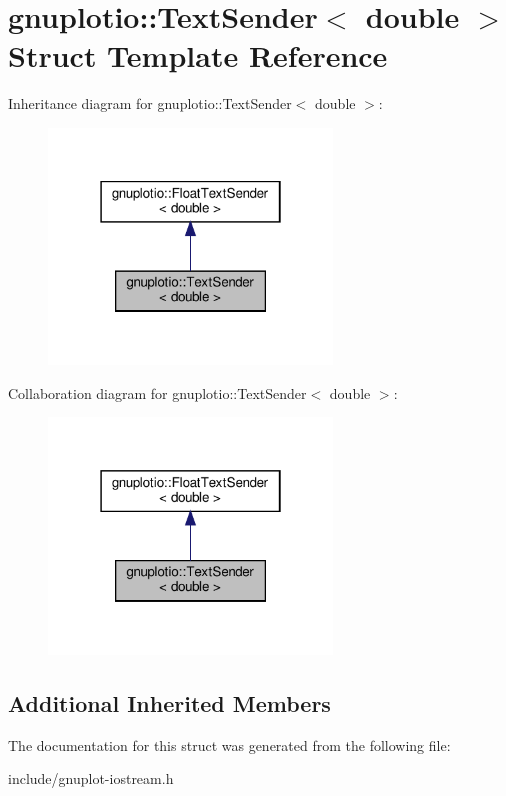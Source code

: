 \hypertarget{structgnuplotio_1_1TextSender_3_01double_01_4}{}\section{gnuplotio\+:\+:Text\+Sender$<$ double $>$ Struct Template Reference}
\label{structgnuplotio_1_1TextSender_3_01double_01_4}


Inheritance diagram for gnuplotio\+:\+:Text\+Sender$<$ double $>$\+:\nopagebreak
\begin{figure}[H]
\begin{center}
\leavevmode
\includegraphics[width=214pt]{structgnuplotio_1_1TextSender_3_01double_01_4__inherit__graph}
\end{center}
\end{figure}


Collaboration diagram for gnuplotio\+:\+:Text\+Sender$<$ double $>$\+:\nopagebreak
\begin{figure}[H]
\begin{center}
\leavevmode
\includegraphics[width=214pt]{structgnuplotio_1_1TextSender_3_01double_01_4__coll__graph}
\end{center}
\end{figure}
\subsection*{Additional Inherited Members}


The documentation for this struct was generated from the following file\+:\begin{DoxyCompactItemize}
\item 
include/gnuplot-\/iostream.\+h\end{DoxyCompactItemize}
